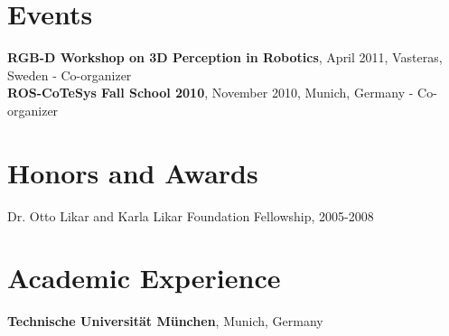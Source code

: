 \documentclass[margin,line]{res}
\begin{document}
\begin{resume}
\section{\sc Events} 
\textbf{RGB-D Workshop on 3D Perception in Robotics}, April 2011, Vasteras, Sweden - Co-organizer\\
\textbf{ROS-CoTeSys Fall School 2010}, November 2010, Munich, Germany - Co-organizer
\section{\sc Honors and Awards} 
Dr. Otto Likar and Karla Likar Foundation Fellowship, 2005-2008
\section{\sc Academic Experience}
{\bf Technische Universit\"at M\"unchen}, Munich, Germany\\
\vspace{-.3cm}


\end{resume}
\end{document}
